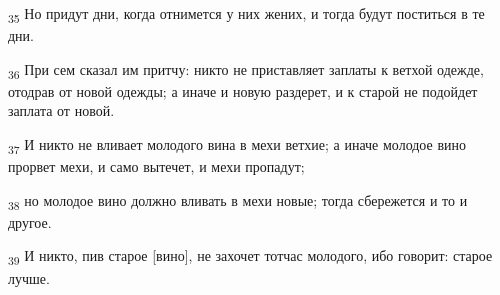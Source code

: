 \begin{tcolorbox}
\textsubscript{35} Но придут дни, когда отнимется у них жених, и тогда будут поститься в те дни.
\end{tcolorbox}
\begin{tcolorbox}
\textsubscript{36} При сем сказал им притчу: никто не приставляет заплаты к ветхой одежде, отодрав от новой одежды; а иначе и новую раздерет, и к старой не подойдет заплата от новой.
\end{tcolorbox}
\begin{tcolorbox}
\textsubscript{37} И никто не вливает молодого вина в мехи ветхие; а иначе молодое вино прорвет мехи, и само вытечет, и мехи пропадут;
\end{tcolorbox}
\begin{tcolorbox}
\textsubscript{38} но молодое вино должно вливать в мехи новые; тогда сбережется и то и другое.
\end{tcolorbox}
\begin{tcolorbox}
\textsubscript{39} И никто, пив старое [вино], не захочет тотчас молодого, ибо говорит: старое лучше.
\end{tcolorbox}
